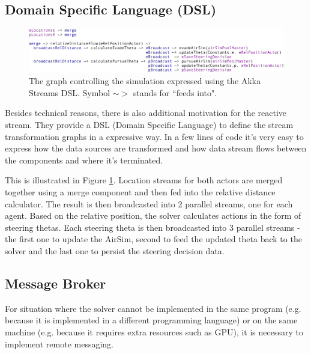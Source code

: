 \documentclass{article}
\begin{document}
\subsection{Domain Specific Language (DSL)}
\begin{figure}
	\centering
	\includegraphics[width=17.0cm]{streams-SDL}
	\caption{The graph controlling the simulation expressed using the Akka Streams DSL. Symbol $\sim$$>$ stands for ``feeds into".}\label{fig:streas-SDL}
\end{figure}

Besides technical reasons, there is also additional motivation for the reactive stream. They provide a DSL (Domain Specific Language) \cite{dsl-book} to define the stream transformation graphs in a expressive way. In a few lines of code it's very easy to express how the data sources are transformed and how data stream flows between the components and where it's terminated.

This is illustrated in Figure \ref{fig:streas-SDL}. Location streams for both actors are merged together using a merge component and then fed into the relative distance calculator. The result is then broadcasted into 2 parallel streams, one for each agent. Based on the relative position, the solver calculates actions in the form of steering thetas. Each steering theta is then broadcasted into 3 parallel streams - the first one to update the AirSim, second to feed the updated theta back to the solver and the last one to persist the steering decision data.









\subsection{Message Broker}
For situation where the solver cannot be implemented in the same program (e.g. because it is implemented in a different programming language) or on the same machine (e.g. because it requires extra resources such as GPU), it is necessary to implement remote messaging.
 
\end{document}
